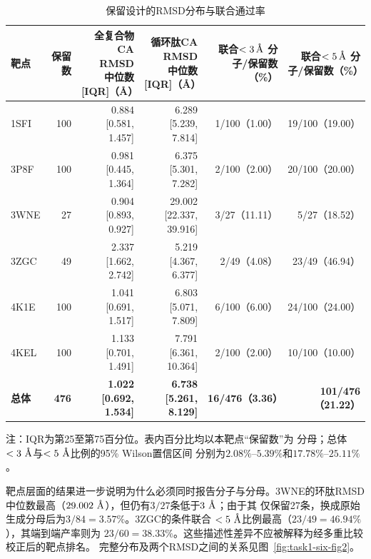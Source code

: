 \begin{table}[H]
  \centering
  \caption{保留设计的RMSD分布与联合通过率}
  \label{tab:six-rmsd}
  \small
  \begin{adjustbox}{max width=\textwidth}
  \begin{tabular}{lrrrrr}
    \toprule
    靶点 & 保留数 &
    \makecell{全复合物CA RMSD\\中位数 [IQR]（\AA）} &
    \makecell{循环肽CA RMSD\\中位数 [IQR]（\AA）} &
    \makecell{联合$<3\,\angstrom$\\分子/保留数（\%）} &
    \makecell{联合$<5\,\angstrom$\\分子/保留数（\%）} \\
    \midrule
    1SFI & 100 & 0.884 [0.581, 1.457] & 6.289 [5.239, 7.814] & 1/100（1.00） & 19/100（19.00） \\
    3P8F & 100 & 0.981 [0.445, 1.364] & 6.375 [5.301, 7.282] & 2/100（2.00） & 20/100（20.00） \\
    3WNE & 27  & 0.904 [0.893, 0.927] & 29.002 [22.337, 39.916] & 3/27（11.11） & 5/27（18.52） \\
    3ZGC & 49  & 2.337 [1.662, 2.742] & 5.219 [4.367, 6.377] & 2/49（4.08） & 23/49（46.94） \\
    4K1E & 100 & 1.041 [0.691, 1.517] & 6.803 [5.071, 7.809] & 6/100（6.00） & 24/100（24.00） \\
    4KEL & 100 & 1.133 [0.701, 1.491] & 7.791 [6.361, 10.364] & 2/100（2.00） & 10/100（10.00） \\
    \midrule
    \textbf{总体} & \textbf{476} & \textbf{1.022 [0.692, 1.534]} &
    \textbf{6.738 [5.261, 8.129]} & \textbf{16/476（3.36）} &
    \textbf{101/476（21.22）} \\
    \bottomrule
  \end{tabular}
  \end{adjustbox}
  \par\vspace{2pt}
  \footnotesize 注：IQR为第25至第75百分位。表内百分比均以本靶点“保留数”为
  分母；总体$<3~\text{\AA}$与$<5~\text{\AA}$比例的95\% Wilson置信区间
  分别为$2.08\%$--$5.39\%$和$17.78\%$--$25.11\%$。
\end{table}

靶点层面的结果进一步说明为什么必须同时报告分子与分母。3WNE的环肽RMSD
中位数最高（$29.002~\text{\AA}$），但仍有$3/27$条低于$3~\text{\AA}$；由于其
仅保留27条，换成原始生成分母后为$3/84=3.57\%$。3ZGC的条件联合
$<5~\text{\AA}$比例最高（$23/49=46.94\%$），其端到端产率则为
$23/60=38.33\%$。这些描述性差异不应被解释为经多重比较校正后的靶点排名。
完整分布及两个RMSD之间的关系见图~\ref{fig:task1-six-fig2}。

